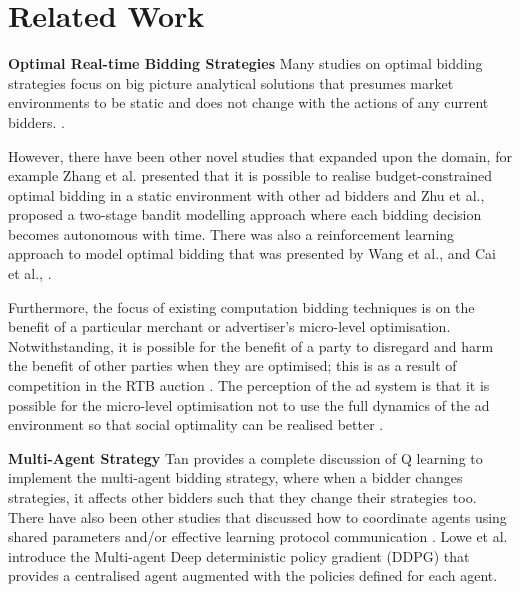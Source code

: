\documentclass{sig-alternate-05-2015}
\begin{document}
\section{Related Work}
\textbf{Optimal Real-time Bidding Strategies}
Many studies on optimal bidding strategies focus on big picture analytical solutions that presumes market environments to be static and does not change with the actions of any current bidders.  \cite{cai_real-time_2017,perlich_bid_2012,wang_human_2017,yuan_meas_2013, zhang_optimal_2014, zhu_ctr_2017}. 

However, there have been other novel studies that expanded upon the domain, for example Zhang et al. \cite{zhang_optimal_2014} presented that it is possible to realise budget-constrained optimal bidding in a static environment with other ad bidders and Zhu et al., \cite{zhu_ctr_2017} proposed a two-stage bandit modelling approach where each bidding decision becomes autonomous with time. There was also a reinforcement learning approach to model optimal bidding that was presented by Wang et al., \cite{wang_human_2017} and Cai et al., \cite{cai_real-time_2017}. 

Furthermore, the focus of existing computation bidding techniques \cite{perlich_bid_2012, zhang_optimal_2014} is on the benefit of a particular merchant or advertiser's micro-level optimisation. Notwithstanding, it is possible for the benefit of a party to disregard and harm the benefit of other parties when they are optimised; this is as a result of competition in the RTB auction \cite{jin_multiagent_2018}. The perception of the ad system is that it is possible for the micro-level optimisation not to use the full dynamics of the ad environment so that social optimality can be realised better \cite{wang_human_2017}.

\textbf{Multi-Agent Strategy}
Tan \cite{tan_reinforcement_1993} provides a complete discussion of Q learning to implement the multi-agent bidding strategy, where when a bidder changes strategies, it affects other bidders such that they change their strategies too. 
There have also been other studies that discussed how to coordinate agents using shared parameters \cite{gupta_coop_2017} and/or effective learning protocol communication \cite{foerster_lear_2016}. Lowe et al. \cite{lowe_actor_2017} introduce the Multi-agent Deep deterministic policy gradient (DDPG) that provides a centralised agent augmented with the policies defined for each agent. 
\end{document}
